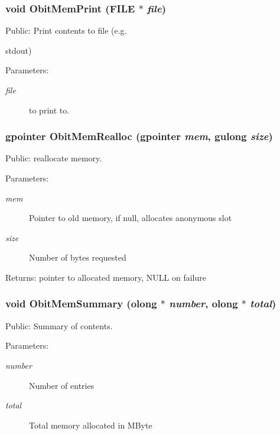 \subsubsection{\setlength{\rightskip}{0pt plus 5cm}void Obit\-Mem\-Print (FILE $\ast$ {\em file})}\label{ObitMem_8c_a17}


Public: Print contents to file (e.g. 

stdout) \begin{Desc}
\item[Parameters:]
\begin{description}
\item[{\em file}]to print to. \end{description}
\end{Desc}
\subsubsection{\setlength{\rightskip}{0pt plus 5cm}gpointer Obit\-Mem\-Realloc (gpointer {\em mem}, gulong {\em size})}\label{ObitMem_8c_a14}


Public: reallocate memory. 

\begin{Desc}
\item[Parameters:]
\begin{description}
\item[{\em mem}]Pointer to old memory, if null, allocates anonymous slot \item[{\em size}]Number of bytes requested \end{description}
\end{Desc}
\begin{Desc}
\item[Returns:]pointer to allocated memory, NULL on failure \end{Desc}
\subsubsection{\setlength{\rightskip}{0pt plus 5cm}void Obit\-Mem\-Summary ({\bf olong} $\ast$ {\em number}, {\bf olong} $\ast$ {\em total})}\label{ObitMem_8c_a18}


Public: Summary of contents. 

\begin{Desc}
\item[Parameters:]
\begin{description}
\item[{\em number}]Number of entries \item[{\em total}]Total memory allocated in MByte \end{description}
\end{Desc}
